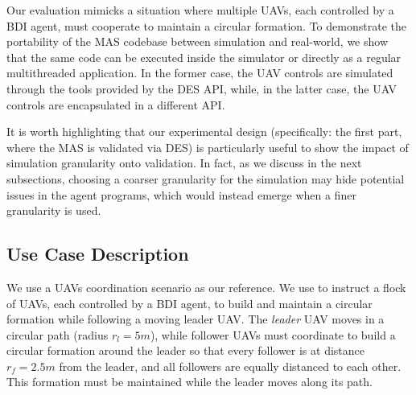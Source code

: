 Our evaluation mimicks a situation where
multiple \acp{UAV}, each controlled by a \ac{BDI} agent,
must cooperate to maintain a circular formation.
%
%
To demonstrate the portability of the \ac{MAS} codebase
between simulation and real-world,
we show that the same code can be executed inside the simulator
or directly as a regular multithreaded application.
%
In the former case, the \ac{UAV} controls are simulated through the tools provided by the
\ac{DES} \ac{API},
while, in the latter case,
the \ac{UAV} controls are encapsulated in a different \ac{API}.


It is worth highlighting that our experimental design
(specifically: the first part, where the \ac{MAS} is validated via \ac{DES})
is particularly useful to show the impact of simulation granularity onto validation.
%
In fact,
as we discuss in the next subsections,
choosing a coarser granularity for the simulation may hide potential issues in the agent programs,
which would instead emerge when a finer granularity is used.

\subsection{Use Case Description}
\label{ssec:simulation:use-case}
We use a \acp{UAV} coordination scenario as our reference.
%
We use \jakta{} to instruct a flock of \acp{UAV},
each controlled by a \ac{BDI} agent,
to build and maintain a circular formation while following a moving leader \ac{UAV}.
%
The \emph{leader} \ac{UAV} moves in a circular path (radius $r_l=5m$),
while follower \acp{UAV} must coordinate to build a circular formation around the leader
so that every follower is at distance $r_f=2.5m$ from the leader,
and all followers are equally distanced to each other.
%
This formation must be maintained while the leader moves along its path.


